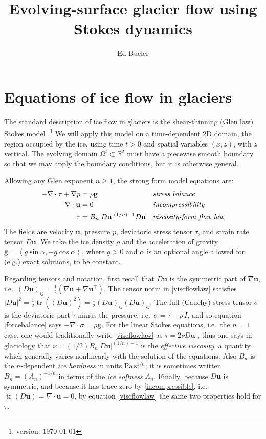 \documentclass[letterpaper,final,12pt,reqno]{amsart}
\newcommand{\RR}{\mathbb{R}}
\newcommand{\grad}{\nabla}
\newcommand{\Div}{\nabla\cdot}
\newcommand{\trace}{\operatorname{tr}}
\newcommand{\bg}{\mathbf{g}}
\newcommand{\bu}{\mathbf{u}}
\begin{document}
\title{Evolving-surface glacier flow using Stokes dynamics}

\author{Ed Bueler}

\maketitle

\thispagestyle{empty}
\bigskip

\section{Equations of ice flow in glaciers} \label{sec:strongform}

The standard description of ice flow in glaciers is the shear-thinning (Glen law) Stokes model \cite{GreveBlatter2009,JouvetRappaz2011}.\footnote{version: \today}  We will apply this model on a time-dependent 2D domain, the region occupied by the ice, using time $t>0$ and spatial variables $(x,z)$, with $z$ vertical.  The evolving domain $\Omega^t \subset \RR^2$ must have a piecewise smooth boundary so that we may apply the boundary conditions, but it is otherwise general.

Allowing any Glen exponent $n\ge 1$, the strong form model equations are:
\begin{align}
- \nabla \cdot \tau + \nabla p &= \rho \bg &&\text{\emph{stress balance}} \label{forcebalance} \\
\nabla \cdot \bu &= 0 &&\text{\emph{incompressibility}} \label{incompressible} \\
\tau &= B_n |D\bu|^{(1/n) - 1} D\bu  &&\text{\emph{viscosity-form flow law}} \label{viscflowlaw}
\end{align}
The fields are velocity $\bu$, pressure $p$, deviatoric stress tensor $\tau$, and strain rate tensor $D\bu$.  We take the ice density $\rho$ and the acceleration of gravity $\bg = \left<g\sin\alpha,-g\cos\alpha\right>$, where $g>0$ and $\alpha$ is an optional angle allowed for (e.g.) exact solutions, to be constant.

Regarding tensors and notation, first recall that $D\bu$ is the symmetric part of $\grad \bu$, i.e.~$(D\bu)_{ij} = \frac{1}{2} \left(\grad\bu + \grad\bu^\top\right)$.  The tensor norm in \eqref{viscflowlaw} satisfies $|D\bu|^2 = \frac{1}{2} \trace\left((D\bu)^2\right) = \frac{1}{2} (D\bu)_{ij} (D\bu)_{ij}$.  The full (Cauchy) stress tensor $\sigma$ is the deviatoric part $\tau$ minus the pressure, i.e.~$\sigma = \tau - p\,I$, and so equation \eqref{forcebalance} says $-\Div \sigma = \rho \bg$.  For the linear Stokes equations, i.e.~the $n=1$ case, one would traditionally write \eqref{viscflowlaw} as $\tau = 2\nu D\bu$ \cite{Elmanetal2014}, thus one says in glaciology that $\nu=(1/2)B_n |D\bu|^{(1/n) - 1}$ is the \emph{effective viscosity}, a quantity which generally varies nonlinearly with the solution of the equations.  Also $B_n$ is the $n$-dependent \emph{ice hardness} in units $\text{Pa}\,\text{s}^{1/n}$; it is sometimes written $B_n = (A_n)^{-1/n}$ in terms of the \emph{ice softness} $A_n$.  Finally, because $D\bu$ is symmetric, and because it has trace zero by \eqref{incompressible}, i.e.~$\trace(D\bu)=\nabla \cdot \bu = 0$, by equation \eqref{viscflowlaw} the same two properties hold for $\tau$.
\end{document}
